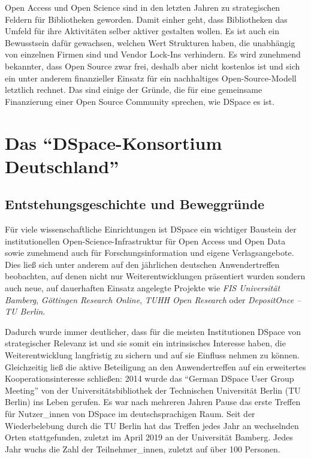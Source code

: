 \documentclass[a4paper,
fontsize=11pt,
oneside,
numbers=noperiodatend,
parskip=half-,
bibliography=totoc,
final
]{scrartcl}
\begin{document}
Open Access und Open Science sind in den letzten Jahren zu strategischen
Feldern für Bibliotheken geworden. Damit einher geht, dass Bibliotheken
das Umfeld für ihre Aktivitäten selber aktiver gestalten wollen. Es ist
auch ein Bewusstsein dafür gewachsen, welchen Wert Strukturen haben, die
unabhängig von einzelnen Firmen sind und Vendor Lock-Ins verhindern. Es
wird zunehmend bekannter, dass Open Source zwar frei, deshalb aber nicht
kostenlos ist und sich ein unter anderem finanzieller Einsatz für ein
nachhaltiges Open-Source-Modell letztlich rechnet. Das sind einige der
Gründe, die für eine gemeinsame Finanzierung einer Open Source Community
sprechen, wie DSpace es ist.

\hypertarget{das-dspace-konsortium-deutschland}{%
\section{\texorpdfstring{Das \enquote{DSpace-Konsortium
Deutschland}}{Das ``DSpace-Konsortium Deutschland''}}\label{das-dspace-konsortium-deutschland}}

\hypertarget{entstehungsgeschichte-und-beweggruxfcnde}{%
\subsection{Entstehungsgeschichte und
Beweggründe}\label{entstehungsgeschichte-und-beweggruxfcnde}}

Für viele wissenschaftliche Einrichtungen ist DSpace ein wichtiger
Baustein der institutionellen Open-Science-Infrastruktur für Open Access
und Open Data sowie zunehmend auch für Forschungsinformation und eigene
Verlagsangebote. Dies ließ sich unter anderem auf den jährlichen
deutschen Anwendertreffen beobachten, auf denen nicht nur
Weiterentwicklungen präsentiert wurden sondern auch neue, auf
dauerhaften Einsatz angelegte Projekte wie \emph{FIS Universität
Bamberg}, \emph{Göttingen Research Online}, \emph{TUHH Open Research}
oder \emph{DepositOnce -- TU Berlin}.

Dadurch wurde immer deutlicher, dass für die meisten Institutionen
DSpace von strategischer Relevanz ist und sie somit ein intrinsisches
Interesse haben, die Weiterentwicklung langfristig zu sichern und auf
sie Einfluss nehmen zu können. Gleichzeitig ließ die aktive Beteiligung
an den Anwendertreffen auf ein erweitertes Kooperationsinteresse
schließen: 2014 wurde das \enquote{German DSpace User Group Meeting} von
der Universitätsbibliothek der Technischen Universität Berlin (TU
Berlin) ins Leben gerufen. Es war nach mehreren Jahren Pause das erste
Treffen für Nutzer\_innen von DSpace im deutschsprachigen Raum. Seit der
Wiederbelebung durch die TU Berlin hat das Treffen jedes Jahr an
wechselnden Orten stattgefunden, zuletzt im April 2019 an der
Universität Bamberg. Jedes Jahr wuchs die Zahl der Teilnehmer\_innen,
zuletzt auf über 100 Personen.
\end{document}
